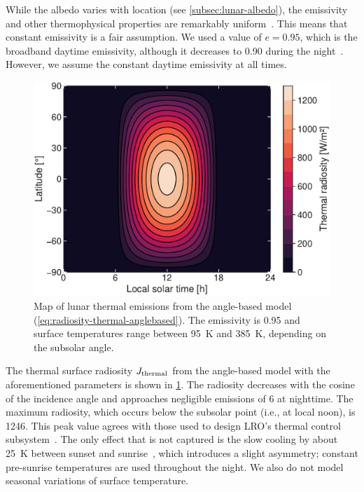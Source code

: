 While the albedo varies with location (see \cref{subsec:lunar-albedo}), the emissivity and other thermophysical properties are remarkably uniform~\cite{Hayne2017}. This means that constant emissivity is a fair assumption. We used a value of $e = 0.95$, which is the broadband daytime emissivity, although it decreases to 0.90 during the night~\cite{Bandfield2015}. However, we assume the constant daytime emissivity at all times.

\begin{figure}[b]
    \centering
    \includegraphics[width=\linewidth]{figures/plots/thermal_map.pdf}
    \caption{Map of lunar thermal emissions from the angle-based model (\cref{eq:radiosity-thermal-anglebased}). The emissivity is 0.95 and surface temperatures range between \qty{95}{\K} and \qty{385}{\K}, depending on the subsolar angle.}
    \label{fig:thermal-map}
\end{figure}

The thermal surface radiosity $J_\textnormal{thermal}$ from the angle-based model with the aforementioned parameters is shown in \cref{fig:thermal-map}. The radiosity decreases with the cosine of the incidence angle and approaches negligible emissions of \qty{6}{\irr} at nighttime. The maximum radiosity, which occurs below the subsolar point (i.e., at local noon), is \qty{1246}{\irr}. This peak value agrees with those used to design \gls{LRO}'s thermal control subsystem~\cite{Tooley2010}. The only effect that is not captured is the slow cooling by about \qty{25}{\K} between sunset and sunrise~\cite{Vasavada2012}, which introduces a slight asymmetry; constant pre-sunrise temperatures are used throughout the night. We also do not model seasonal variations of surface temperature.





